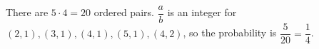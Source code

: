 There are $5\cdot4=20$ ordered pairs. $\dfrac ab$ is an integer for $(2,1),(3,1),(4,1),(5,1),(4,2)$, so the probability is $\dfrac5{20}=\boxed{\dfrac14}$.
